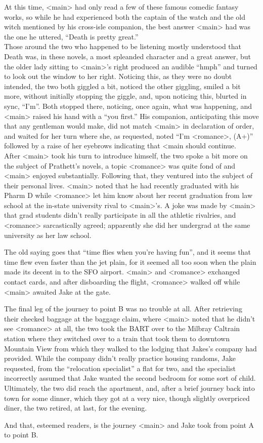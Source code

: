\documentclass[12pt,openany]{memoir}
\begin{document}
At this time, <main> had only read a few of these famous comedic fantasy works, so while he had experienced both the captain of the watch and the old witch mentioned by his cross-isle companion, the best answer <main> had was the one he uttered, ``Death is pretty great.''
\\

Those around the two who happened to be listening mostly understood that Death was, in these novels, a most spleanded character and a great answer, but the older lady sitting to <main>'s right produced an audible ``hmph'' and turned to look out the window to her right.
Noticing this, as they were no doubt intended, the two both giggled a bit, noticed the other giggling, smiled a bit more, without initially stopping the giggle, and, upon noticing this, blurted in sync, ``I'm''.
Both stopped there, noticing, once again, what was happening, and <main> raised his hand with a ``you first.''
His companion, anticipating this move that any gentleman would make, did not match <main> in declaration of order, and waited for her turn where she, as requested, noted ``I'm <romance>, (A+)'' followed by a raise of her eyebrows indicating that <main should continue.
\\

After <main> took his turn to introduce himself, the two spoke a bit more on the subject of Prathett's novels, a topic <romance> was quite fond of and <main> enjoyed substantially.
Following that, they ventured into the subject of their personal lives.
<main> noted that he had recently graduated with his Pharm D while <romance> let him know about her recent graduation from law school at the in-state university rival to <main>'s.
A joke was made by <main> that grad students didn't really participate in all the athletic rivalries, and <romance> sarcastically agreed; apparently she did her undergrad at the same university as her law school.

The old saying goes that ``time flies when you're having fun'', and it seems that time flew even faster than the jet plain, for it seemed all too soon when the plain made its decent in to the SFO airport.
<main> and <romance> exchanged contact cards, and after disboarding the flight, <romance> walked off while <main> awaited Jake at the gate.

The final leg of the journey to point B was no trouble at all.
After retrieving their checked baggage at the baggage claim, where <main> noted that he didn't see <romance> at all, the two took the BART over to the Milbray Caltrain station where they switched over to a train that took them to downtown Mountain View from which they walked to the lodging that Jakes's company had provided.
While the company didn't really practice housing randoms, Jake requested, from the ``relocation specialist'' a flat for two, and the specialist incorrectly assumed that Jake wanted the second bedroom for some sort of child.
Ultimately, the two did reach the apartment, and, after a brief journey back into town for some dinner, which they got at a very nice, though slightly overpriced diner, the two retired, at last, for the evening.

And that, esteemed readers, is the journey <main> and Jake took from point A to point B.
\end{document}
